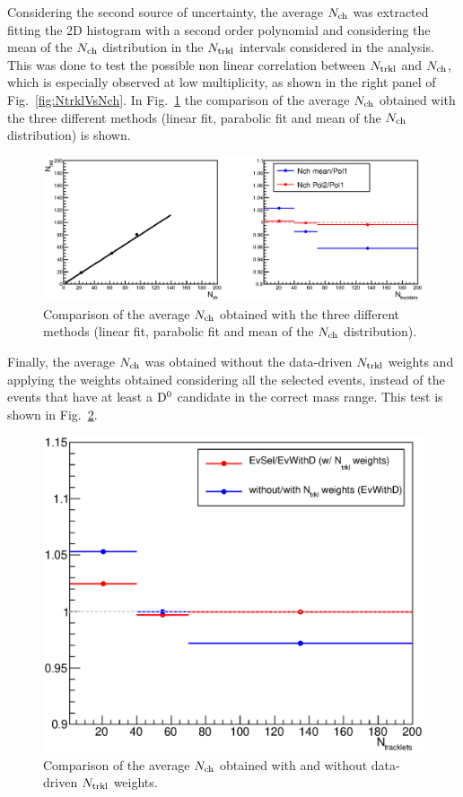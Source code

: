 Considering the second source of uncertainty, the average $N_{\rm ch}$ 
was extracted fitting the 2D histogram with a second order polynomial 
and considering the mean of the $N_{\rm ch}$ distribution in the $N_{\rm trkl}$ 
intervals considered in the analysis. This was done to test the possible 
non linear correlation between $N_{\rm trkl}$ and $N_{\rm ch}$, which is especially 
observed at low multiplicity, as shown in the right panel of Fig.~\ref{fig:NtrklVsNch}. 
In Fig.~\ref{fig:NchVsCorrHypo} the comparison of the average $N_{\rm ch}$ 
obtained with the three different methods (linear fit, parabolic fit and mean of the $N_{\rm ch}$ distribution) is shown.

\begin{figure}[htpb]
\centering
 \includegraphics[width=.9\textwidth]{FigCap6/NchSystematics_linFit_17f2a}
 \caption{Comparison of the average $N_{\rm ch}$ obtained with the three different methods (linear fit, parabolic fit and mean of the $N_{\rm ch}$ distribution).}
 \label{fig:NchVsCorrHypo}
 \end{figure}

Finally, the average $N_{\rm ch}$ was obtained without the data-driven 
$N_{\rm trkl}$ weights and applying the weights obtained considering all 
the selected events, instead of the events that have at least a 
${\rm D^0}$ candidate in the correct mass range. This test is shown in Fig.~\ref{fig:NchVsNtrklWithWOweights}.

\begin{figure}[htpb]
\centering
 \includegraphics[width=.7\textwidth]{FigCap6/NchSystematics_NtrklWeights_17f2a.eps}
 \caption{Comparison of the average $N_{\rm ch}$ obtained with and without data-driven $N_{\rm trkl}$ weights.}
 \label{fig:NchVsNtrklWithWOweights}
 \end{figure}

